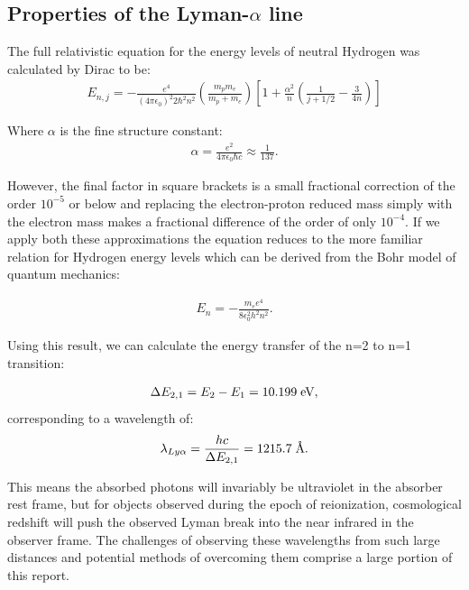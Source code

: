 \documentclass[pdf,color]{UoBnote}
\begin{document}
\subsection{Properties of the Lyman-$\alpha$ line}


The full relativistic equation for the energy levels of neutral Hydrogen was calculated by Dirac to be:
\begin{align}
			E_{n,j} = - \frac{e^4}{ (4 \pi \epsilon_0)^2 2 \hbar^2 n^2} \left( \frac{m_p m_e}{m_p + m_e} \right) %
					\left [ 1 + \frac{\alpha^2}{n} \left( \frac{1}{j+1/2} - \frac{3}{4n} \right) \right]
\end{align}

Where $\alpha$ is the fine structure constant:
\begin{align}		
			\alpha = \frac{e^2}{4 \pi \epsilon_0 \hbar c}  \approx \frac{1}{137}.
\end{align}

However, the final factor in square brackets is a small fractional correction of the order $10^{-5}$ or below and replacing the electron-proton reduced mass simply with the electron mass makes a fractional difference of the order of only $10^{-4}$. If we apply both these approximations the equation reduces to the more familiar relation for Hydrogen energy levels which can be derived from the Bohr model of quantum mechanics:

\begin{align}
			E_n = - \frac{m_e e^4}{8 \epsilon_0^2 h^2 n^2}.
\end{align}

Using this result, we can calculate the energy transfer of the n=2 to n=1 transition:

\begin{align}
			\Delta E_{2,1} = E_2 - E_1 = 10.199\; \textup{eV} ,
\end{align}
corresponding to a wavelength of:
\begin{align}
			\lambda_{Ly\alpha} = \frac{hc}{\Delta E_{2,1}} = 1215.7 \; \textup{\AA}.
\end{align}

This means the absorbed photons will invariably be ultraviolet in the absorber rest frame, but for objects observed during the epoch of reionization, cosmological redshift will push the observed Lyman break into the near infrared in the observer frame. The challenges of observing these wavelengths from such large distances and potential methods of overcoming them comprise a large portion of this report. 
\end{document}
